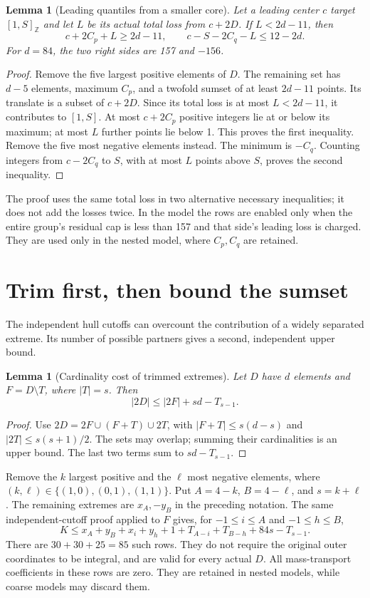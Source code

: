 \documentclass[11pt,a4paper]{article}
\newcommand{\Z}{\mathbb Z}
\newtheorem{lemma}[theorem]{Lemma}
\begin{document}
\begin{lemma}[Leading quantiles from a smaller core]\label{deep}
Let a leading center $c$ target $[1,S]_{\Z}$ and let $L$ be its actual
total loss from $c+2D$. If $L<2d-11$, then
\[
 c+2C_p+L\ge2d-11,\qquad
 c-S-2C_q-L\le12-2d.
\]
For $d=84$, the two right sides are 157 and $-156$.
\end{lemma}
\begin{proof}
Remove the five largest positive elements of $D$. The remaining set
has $d-5$ elements, maximum $C_p$, and a twofold sumset of at least
$2d-11$ points. Its translate is a subset of $c+2D$. Since its total
loss is at most $L<2d-11$, it contributes to $[1,S]$.
At most $c+2C_p$ positive integers lie at or below its maximum;
at most $L$ further points lie below 1. This proves the first inequality.
Remove the five most negative elements instead. The minimum is
$-C_q$. Counting integers from $c-2C_q$ to $S$, with at most $L$
points above $S$, proves the second inequality.
\end{proof}
The proof uses the same total loss in two alternative necessary
inequalities; it does not add the losses twice. In the model the rows
are enabled only when the entire group's residual cap is less than
157 and that side's leading loss is charged. They are used only in the
nested model, where $C_p,C_q$ are retained.

\section{Trim first, then bound the sumset}
The independent hull cutoffs can overcount the contribution of a
widely separated extreme. Its number of possible partners gives a
second, independent upper bound.
\begin{lemma}[Cardinality cost of trimmed extremes]\label{trim}
Let $D$ have $d$ elements and $F=D\setminus T$, where $|T|=s$.
Then
\[
 |2D|\le |2F|+sd-T_{s-1}.
\]
\end{lemma}
\begin{proof}
Use $2D=2F\cup(F+T)\cup2T$, with
$|F+T|\le s(d-s)$ and $|2T|\le s(s+1)/2$.
The sets may overlap; summing their cardinalities is an upper bound.
The last two terms sum to $sd-T_{s-1}$.
\end{proof}
Remove the $k$ largest positive and the $\ell$ most negative elements,
where $(k,\ell)\in\{(1,0),(0,1),(1,1)\}$. Put
$A=4-k$, $B=4-\ell$, and $s=k+\ell$.
The remaining extremes are $x_A,-y_B$ in the preceding notation.
The same independent-cutoff proof applied to $F$ gives, for
$-1\le i\le A$ and $-1\le h\le B$,
\begin{equation}\label{trimrow}
 K\le x_A+y_B+x_i+y_h+1+T_{A-i}+T_{B-h}+84s-T_{s-1}.
\end{equation}
There are $30+30+25=85$ such rows. They do not require the original
outer coordinates to be integral, and are valid for every actual $D$.
All mass-transport coefficients in these rows are zero. They are
retained in nested models, while coarse models may discard them.
\end{document}
